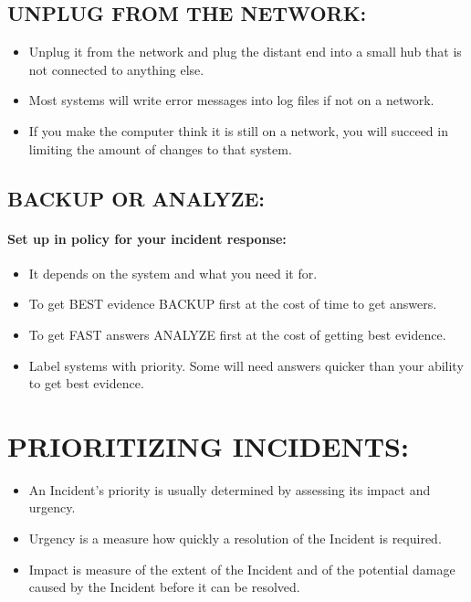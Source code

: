 \documentclass[10pt,british,english]{article}
\begin{document}
\subsection{UNPLUG FROM THE NETWORK:}
\begin{itemize}
\item Unplug it from the network and plug the distant end into a small hub
that is not connected to anything else.
\item Most systems will write error messages into log files if not on a
network. 
\item If you make the computer think it is still on a network, you will
succeed in limiting the amount of changes to that system.
\end{itemize}

\subsection{BACKUP OR ANALYZE:}

\paragraph{Set up in policy for your incident response:}
\begin{itemize}
\item It depends on the system and what you need it for.
\item To get BEST evidence BACKUP first at the cost of time to get answers.
\item To get FAST answers ANALYZE first at the cost of getting best evidence.
\item Label systems with priority. Some will need answers quicker than your
ability to get best evidence.
\end{itemize}
%

\section{PRIORITIZING INCIDENTS:}
\begin{itemize}
\item An Incident's priority is usually determined by assessing its impact
and urgency.
\item Urgency is a measure how quickly a resolution of the Incident is required.
\item Impact is measure of the extent of the Incident and of the potential
damage caused by the Incident before it can be resolved.
\end{itemize}
\end{document}
